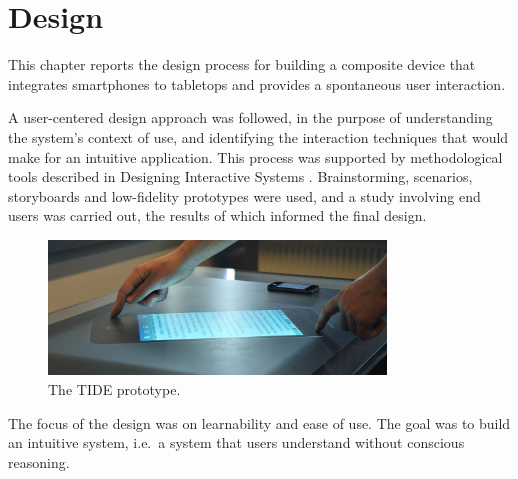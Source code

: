 
\chapter{Design}
\label{design}

This chapter reports the design process for building a composite device that integrates smartphones to tabletops and provides a spontaneous user interaction.

A user-centered design approach was followed, in the purpose of understanding the system's context of use, and identifying the interaction techniques that would make for an intuitive application.
This process was supported by methodological tools described in Designing Interactive Systems \citep{Benyon:2010}.
Brainstorming, scenarios, storyboards and low-fidelity prototypes were used, and a study involving end users was carried out, the results of which informed the final design.

\begin{figure}[htb]
  \centering
    \includegraphics[width=0.8\textwidth]{images/tide314}
    \caption{The TIDE prototype.}
    \label{fig:tideHands}
\end{figure}

The focus of the design was on learnability and ease of use.
The goal was to build an intuitive system, i.e.\ a system that users understand without conscious reasoning.

